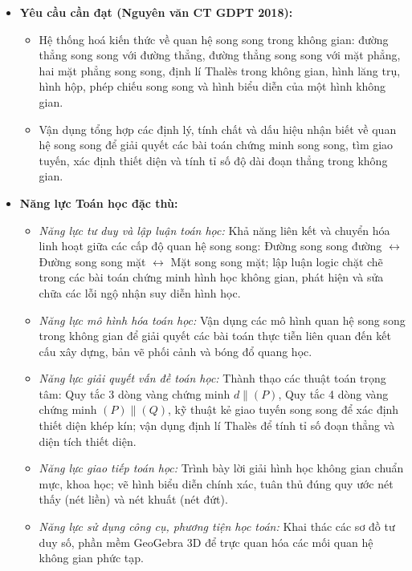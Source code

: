 \documentclass[12pt, a4paper]{article}
\begin{document}
\begin{itemize}[leftmargin=1.2cm]
    \item \textbf{Yêu cầu cần đạt (Nguyên văn CT GDPT 2018):}
    \begin{itemize}[leftmargin=0.6cm]
        \item Hệ thống hoá kiến thức về quan hệ song song trong không gian: đường thẳng song song với đường thẳng, đường thẳng song song với mặt phẳng, hai mặt phẳng song song, định lí Thalès trong không gian, hình lăng trụ, hình hộp, phép chiếu song song và hình biểu diễn của một hình không gian.
        \item Vận dụng tổng hợp các định lý, tính chất và dấu hiệu nhận biết về quan hệ song song để giải quyết các bài toán chứng minh song song, tìm giao tuyến, xác định thiết diện và tính tỉ số độ dài đoạn thẳng trong không gian.
    \end{itemize}

    \item \textbf{Năng lực Toán học đặc thù:}
    \begin{itemize}[leftmargin=0.6cm]
        \item \textit{Năng lực tư duy và lập luận toán học:} Khả năng liên kết và chuyển hóa linh hoạt giữa các cấp độ quan hệ song song: Đường song song đường $\longleftrightarrow$ Đường song song mặt $\longleftrightarrow$ Mặt song song mặt; lập luận logic chặt chẽ trong các bài toán chứng minh hình học không gian, phát hiện và sửa chữa các lỗi ngộ nhận suy diễn hình học.
        \item \textit{Năng lực mô hình hóa toán học:} Vận dụng các mô hình quan hệ song song trong không gian để giải quyết các bài toán thực tiễn liên quan đến kết cấu xây dựng, bản vẽ phối cảnh và bóng đổ quang học.
        \item \textit{Năng lực giải quyết vấn đề toán học:} Thành thạo các thuật toán trọng tâm: Quy tắc 3 dòng vàng chứng minh $d \parallel (P)$, Quy tắc 4 dòng vàng chứng minh $(P) \parallel (Q)$, kỹ thuật kẻ giao tuyến song song để xác định thiết diện khép kín; vận dụng định lí Thalès để tính tỉ số đoạn thẳng và diện tích thiết diện.
        \item \textit{Năng lực giao tiếp toán học:} Trình bày lời giải hình học không gian chuẩn mực, khoa học; vẽ hình biểu diễn chính xác, tuân thủ đúng quy ước nét thấy (nét liền) và nét khuất (nét đứt).
        \item \textit{Năng lực sử dụng công cụ, phương tiện học toán:} Khai thác các sơ đồ tư duy số, phần mềm GeoGebra 3D để trực quan hóa các mối quan hệ không gian phức tạp.
    \end{itemize}


\end{itemize}
\end{document}
